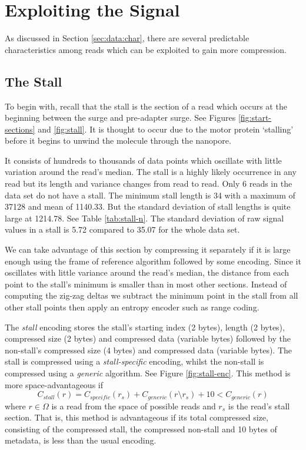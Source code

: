\section{Exploiting the Signal}

As discussed in Section
\ref{sec:data:char},
there are several predictable characteristics among reads which can be exploited
to gain more compression.

\subsection{The Stall}

To begin with, recall that the stall is the section of a read which occurs at
the beginning between the surge and pre-adapter surge. See Figures
\ref{fig:start-sections} and \ref{fig:stall}. It is thought to occur due to the
motor protein `stalling' before it begins to unwind the molecule through the
nanopore.



It consists of hundreds to thousands of data points which oscillate with little
variation around the read's median. The stall is a highly likely occurrence in
any read but its length and variance changes from read to read.  Only 6 reads in
the data set do not have a stall. The minimum stall length is 34 with a maximum
of \num{37128} and mean of 1140.33. But the standard deviation of stall lengths
is quite large at 1214.78. See Table \ref{tab:stall-n}. The standard deviation
of raw signal values in a stall is 5.72 compared to 35.07 for the whole data
set.



We can take advantage of this section by compressing it separately if it is
large enough using the frame of reference algorithm followed by some encoding.
Since it oscillates with little variance around the read's median, the distance
from each point to the stall's minimum is smaller than in most other sections.
Instead of computing the zig-zag deltas we subtract the minimum point in the
stall from all other stall points then apply an entropy encoder such as
range coding.

The \textit{stall} encoding stores the stall's starting index (2 bytes), length
(2 bytes), compressed size (2 bytes) and compressed data (variable bytes)
followed by the non-stall's compressed size (4 bytes) and compressed data
(variable bytes). The stall is compressed using a \textit{stall-specific}
encoding, whilst the non-stall is compressed using a \textit{generic} algorithm.
See Figure \ref{fig:stall-enc}.
This method is more space-advantageous if
\[ C_{stall}(r) = C_{specific}(r_s) + C_{generic}(r\setminus r_s) + 10 < C_{generic}(r) \]
where $r\in\Omega$ is a read from the space of possible reads and $r_s$ is the
read's stall section. That is, this method is advantageous if its total
compressed size, consisting of the compressed stall, the compressed non-stall
and 10 bytes of metadata, is less than the usual encoding.

